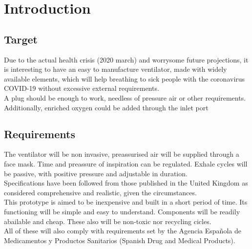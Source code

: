 \section{Introduction}
\subsection{Target}
    Due to the actual health crisis (2020 march) and worrysome future projections, it is interesting to have an easy to manufacture ventilator, made with widely available elements, which will help breathing to sick people with the coronavirus COVID-19 without excessive external requirements.\\
    
    A plug should be enough to work, needless of pressure air or other requirements.
    Additionally, enriched oxygen could be added through the inlet port
    
\subsection{Requirements}
    The ventilator will be non invasive, preassurised air will be supplied through a face mask. Time and preassure of inspiration can be regulated. Exhale cycles will be passive, with positive pressure and adjustable in duration.\\
    
    Specifications have been followed from those published in the United Kingdom \cite{MHRA} as considered comprehensive and realistic, given the circumstances.\\
    
    This prototype is aimed to be inexpensive and built in a short period of time. Its functioning will be simple and easy to understand. Components will be readily abailable and cheap. These also will be non-toxic nor recycling cicles.\\
    
    All of these will also comply with requirements set by the Agencia Española de Medicamentos y Productos Sanitarios (Spanish Drug and Medical Products).
    